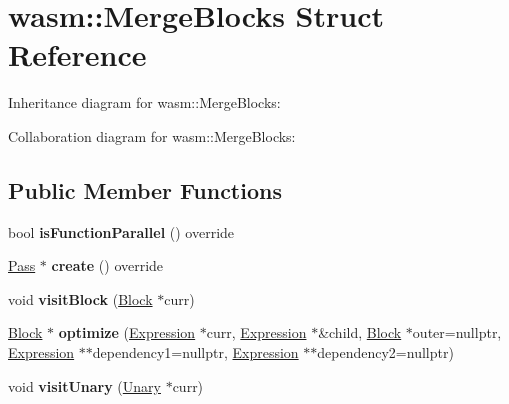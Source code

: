 \hypertarget{structwasm_1_1_merge_blocks}{}\section{wasm\+:\+:Merge\+Blocks Struct Reference}
\label{structwasm_1_1_merge_blocks}


Inheritance diagram for wasm\+:\+:Merge\+Blocks\+:


Collaboration diagram for wasm\+:\+:Merge\+Blocks\+:
\subsection*{Public Member Functions}
\begin{DoxyCompactItemize}
\item 
\mbox{\label{structwasm_1_1_merge_blocks_a1622d7ff3928868df84b1d451d9870b8}} 
bool {\bfseries is\+Function\+Parallel} () override
\item 
\mbox{\label{structwasm_1_1_merge_blocks_a68e3586533c12b14458fb49d917d1e4f}} 
\mbox{\hyperlink{classwasm_1_1_pass}{Pass}} $\ast$ {\bfseries create} () override
\item 
\mbox{\label{structwasm_1_1_merge_blocks_a232ae38ff11a597420b38d1b68fc55b0}} 
void {\bfseries visit\+Block} (\mbox{\hyperlink{classwasm_1_1_block}{Block}} $\ast$curr)
\item 
\mbox{\label{structwasm_1_1_merge_blocks_a03b4adb0d913236318eddbc797bdf20c}} 
\mbox{\hyperlink{classwasm_1_1_block}{Block}} $\ast$ {\bfseries optimize} (\mbox{\hyperlink{classwasm_1_1_expression}{Expression}} $\ast$curr, \mbox{\hyperlink{classwasm_1_1_expression}{Expression}} $\ast$\&child, \mbox{\hyperlink{classwasm_1_1_block}{Block}} $\ast$outer=nullptr, \mbox{\hyperlink{classwasm_1_1_expression}{Expression}} $\ast$$\ast$dependency1=nullptr, \mbox{\hyperlink{classwasm_1_1_expression}{Expression}} $\ast$$\ast$dependency2=nullptr)
\item 
\mbox{\label{structwasm_1_1_merge_blocks_a1ca679d765b1b0d601821b3e00465fd1}} 
void {\bfseries visit\+Unary} (\mbox{\hyperlink{classwasm_1_1_unary}{Unary}} $\ast$curr)
\item 

\end{DoxyCompactItemize}
